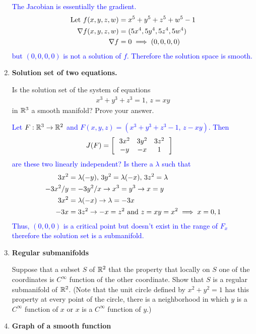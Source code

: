 \documentclass[12pt,a4paper]{report}
\newcommand{\BLUE}[1]{\textcolor{blue}{#1}}
\begin{document}
\begin{enumerate}[label=9.\arabic*.]
\BLUE{The Jacobian is essentially the gradient.
\begin{align*}
	\text{Let } f(x,y,z,w) &= x^5+y^5+z^5+w^5-1 \\
	\nabla f(x,y,z,w) &= (5x^4, 5y^4, 5z^4, 5w^4)\\
	\nabla f &= 0 \implies (0,0,0,0)
\end{align*}but $(0,0,0,0)$ is not a solution of $f$.  Therefore the solution space is smooth.
}

\item \textbf{Solution set of two equations.}

Is the solution set of the system of equations 
\begin{align*}
	x^3+y^3+z^3=1,\, z=xy
\end{align*}in $\mathbb{R}^3$ a smooth manifold?  Prove your answer.

\BLUE{Let $F: \mathbb{R}^3 \to \mathbb{R}^2$ and $F(x,y,z) = (x^3+y^3+z^3-1,\, z-xy)$.  Then
\begin{align*}
	J(F) &= \left [\, \begin{array}{ccc}
		3x^2 & 3y^2 & 3z^2 \\
		-y & -x & 1
	\end{array}
	 \,\right ]
\end{align*}are these two linearly independent?  Is there a $\lambda$ such that 
\begin{align*}
	3x^2 &= \lambda(-y), \, 3y^2 = \lambda(-x), \, 3z^2 = \lambda \\
	-3x^2/y &= -3y^2/x \to x^3 = y^3 \to x=y\\
	3x^2 &= \lambda(-x) \to \lambda = -3x \\
	-3x &= 3z^2 \to -x=z^2 \text{ and } z=xy=x^2 \implies x = 0, 1
\end{align*}Thus, $(0,0,0)$ is a critical point but doesn't exist in the range of $F_x$ therefore the solution set is a submanifold.
}

\item \textbf{Regular submanifolds}

Suppose that a subset $S$ of $\mathbb{R}^2$ that the property that locally on $S$ one of the coordinates is $C^\infty$ function of the other coordinate.  Show that $S$ is a regular submanifold of $\mathbb{R}^2$. (Note that the unit circle defined by $x^2+y^2=1$ has this property at every point of the circle, there is a neighborhood in which $y$ is a $C^\infty$ function of $x$ or $x$ is a $C^\infty$ function of $y$.)

\item \textbf{Graph of a smooth function}


\end{enumerate}
\end{document}
